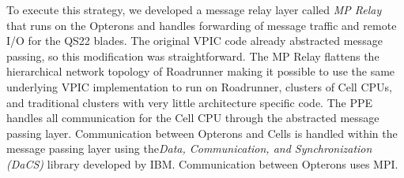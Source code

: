 \documentclass[10pt]{article}
\begin{document}





To execute this strategy, we developed a message relay layer called
\emph{MP Relay} that runs on the Opterons and handles forwarding of
message traffic and remote I/O for the QS22 blades.  The original VPIC
code already abstracted message passing, so this modification was
straightforward.  The MP Relay flattens the hierarchical network
topology of Roadrunner making it possible to use the same underlying
VPIC implementation to run on Roadrunner, clusters of Cell CPUs, and
traditional clusters with very little architecture specific code.  The
PPE handles all communication for the Cell CPU through the abstracted
message passing layer.  Communication between Opterons and Cells is
handled within the message passing layer using the\emph{Data,
Communication, and Synchronization (DaCS)} library developed by IBM.
Communication between Opterons uses MPI.

\end{document}
